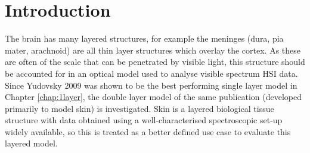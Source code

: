 % 


\section{Introduction}\label{sec:intro2}
The brain has many layered structures, for example the meninges (dura, pia mater, arachnoid) are all thin layer structures which overlay the cortex. As these are often of the scale that can be penetrated by visible light, this structure should be accounted for in an optical model used to analyse visible spectrum HSI data. Since Yudovsky 2009 was shown to be the best performing single layer model in Chapter \ref{chap:1layer}, the double layer model of the same publication\cite{Yudovsky2009} (developed primarily to model skin) is investigated. Skin is a layered biological tissue structure with data obtained using a well-characterised spectroscopic set-up widely available\cite{Cooksey2017}, so this is treated as a better defined use case to evaluate this layered model. 


